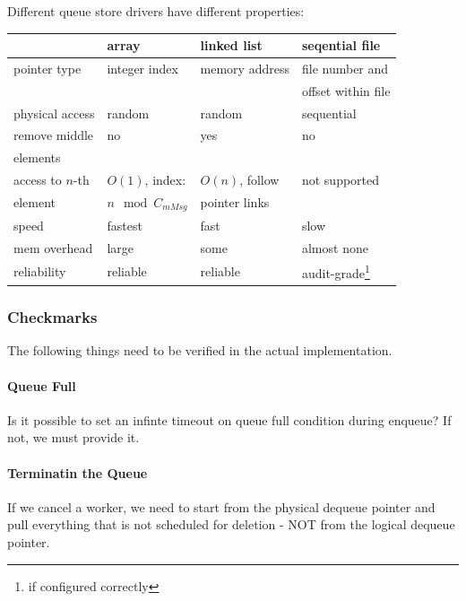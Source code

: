 \documentclass[a4paper,10pt]{article}
\begin{document}
Different queue store drivers have different properties:

\begin{tabular}{|l||l|l|l|}\hline
		&	array 	& linked list		& seqential file \\ \hline
pointer type	& integer index	& memory address	& file number and \\
		&		&			& offset within file \\ \hline
physical access	& random	& random		& sequential \\ \hline
remove middle	& no		& yes			& no \\
elements	&		&			& \\ \hline
access to $n$-th& $O(1)$, index:& $O(n)$, follow	& not supported \\
element		& $n \mod C_{mMsg}$	& pointer links	& \\ \hline
speed		& fastest	& fast			& slow \\\hline
mem overhead	& large		& some			& almost none \\\hline
reliability	& reliable	& reliable		& audit-grade\footnote{if configured correctly}\\
\hline
\end{tabular}

\subsubsection{Checkmarks}
The following things need to be verified in the actual implementation.

\paragraph{Queue Full}
Is it possible to set an infinte timeout on queue full condition during enqueue? If not, we must provide it.

\paragraph{Terminatin the Queue}
If we cancel a worker, we need to start from the physical dequeue pointer and pull everything that is not scheduled for deletion - NOT from the logical dequeue pointer.
\end{document}
